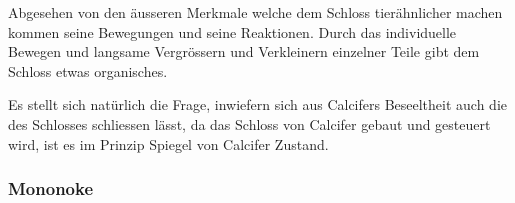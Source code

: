 Abgesehen von den äusseren Merkmale welche dem Schloss tierähnlicher machen kommen seine Bewegungen und seine Reaktionen. Durch das individuelle Bewegen und langsame Vergrössern und Verkleinern einzelner Teile gibt dem Schloss etwas organisches. 

Es stellt sich natürlich die Frage, inwiefern sich aus Calcifers Beseeltheit auch die des Schlosses schliessen lässt, da das Schloss von Calcifer gebaut und gesteuert wird, ist es im Prinzip Spiegel von Calcifer Zustand.

\subsubsection*{Mononoke} 